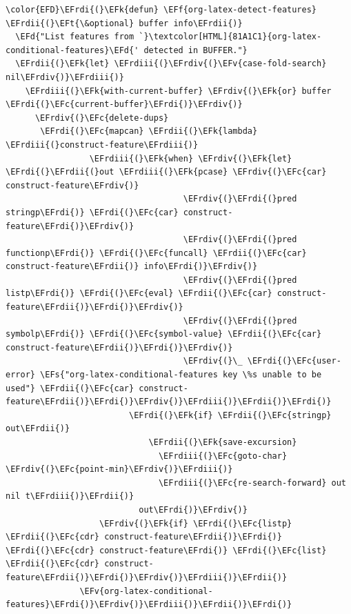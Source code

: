 \documentclass{scrartcl}
\newcommand{\EFk}[1]{\textcolor{EFk}{#1}} %
\newcommand{\EFd}[1]{\textcolor{EFd}{#1}} %
\newcommand{\EFt}[1]{\textcolor{EFt}{#1}} %
\newcommand{\EFs}[1]{\textcolor{EFs}{#1}} %
\newcommand{\EFc}[1]{\textcolor{EFc}{#1}} %
\newcommand{\EFv}[1]{\textcolor{EFv}{#1}} %
\newcommand{\EFf}[1]{\textcolor{EFf}{#1}} %
\newcommand{\EFrdi}[1]{#1} %
\newcommand{\EFrdii}[1]{#1} %
\newcommand{\EFrdiii}[1]{#1} %
\newcommand{\EFrdiv}[1]{#1} %
\begin{document}
\begin{Code}
\begin{Verbatim}[]
\color{EFD}\EFrdi{(}\EFk{defun} \EFf{org-latex-detect-features} \EFrdii{(}\EFt{\&optional} buffer info\EFrdii{)}
  \EFd{"List features from `}\textcolor[HTML]{81A1C1}{org-latex-conditional-features}\EFd{' detected in BUFFER."}
  \EFrdii{(}\EFk{let} \EFrdiii{(}\EFrdiv{(}\EFv{case-fold-search} nil\EFrdiv{)}\EFrdiii{)}
    \EFrdiii{(}\EFk{with-current-buffer} \EFrdiv{(}\EFk{or} buffer \EFrdi{(}\EFc{current-buffer}\EFrdi{)}\EFrdiv{)}
      \EFrdiv{(}\EFc{delete-dups}
       \EFrdi{(}\EFc{mapcan} \EFrdii{(}\EFk{lambda} \EFrdiii{(}construct-feature\EFrdiii{)}
                 \EFrdiii{(}\EFk{when} \EFrdiv{(}\EFk{let} \EFrdi{(}\EFrdii{(}out \EFrdiii{(}\EFk{pcase} \EFrdiv{(}\EFc{car} construct-feature\EFrdiv{)}
                                    \EFrdiv{(}\EFrdi{(}pred stringp\EFrdi{)} \EFrdi{(}\EFc{car} construct-feature\EFrdi{)}\EFrdiv{)}
                                    \EFrdiv{(}\EFrdi{(}pred functionp\EFrdi{)} \EFrdi{(}\EFc{funcall} \EFrdii{(}\EFc{car} construct-feature\EFrdii{)} info\EFrdi{)}\EFrdiv{)}
                                    \EFrdiv{(}\EFrdi{(}pred listp\EFrdi{)} \EFrdi{(}\EFc{eval} \EFrdii{(}\EFc{car} construct-feature\EFrdii{)}\EFrdi{)}\EFrdiv{)}
                                    \EFrdiv{(}\EFrdi{(}pred symbolp\EFrdi{)} \EFrdi{(}\EFc{symbol-value} \EFrdii{(}\EFc{car} construct-feature\EFrdii{)}\EFrdi{)}\EFrdiv{)}
                                    \EFrdiv{(}\_ \EFrdi{(}\EFc{user-error} \EFs{"org-latex-conditional-features key \%s unable to be used"} \EFrdii{(}\EFc{car} construct-feature\EFrdii{)}\EFrdi{)}\EFrdiv{)}\EFrdiii{)}\EFrdii{)}\EFrdi{)}
                         \EFrdi{(}\EFk{if} \EFrdii{(}\EFc{stringp} out\EFrdii{)}
                             \EFrdii{(}\EFk{save-excursion}
                               \EFrdiii{(}\EFc{goto-char} \EFrdiv{(}\EFc{point-min}\EFrdiv{)}\EFrdiii{)}
                               \EFrdiii{(}\EFc{re-search-forward} out nil t\EFrdiii{)}\EFrdii{)}
                           out\EFrdi{)}\EFrdiv{)}
                   \EFrdiv{(}\EFk{if} \EFrdi{(}\EFc{listp} \EFrdii{(}\EFc{cdr} construct-feature\EFrdii{)}\EFrdi{)} \EFrdi{(}\EFc{cdr} construct-feature\EFrdi{)} \EFrdi{(}\EFc{list} \EFrdii{(}\EFc{cdr} construct-feature\EFrdii{)}\EFrdi{)}\EFrdiv{)}\EFrdiii{)}\EFrdii{)}
               \EFv{org-latex-conditional-features}\EFrdi{)}\EFrdiv{)}\EFrdiii{)}\EFrdii{)}\EFrdi{)}
\end{Verbatim}
\end{Code}
\end{document}
